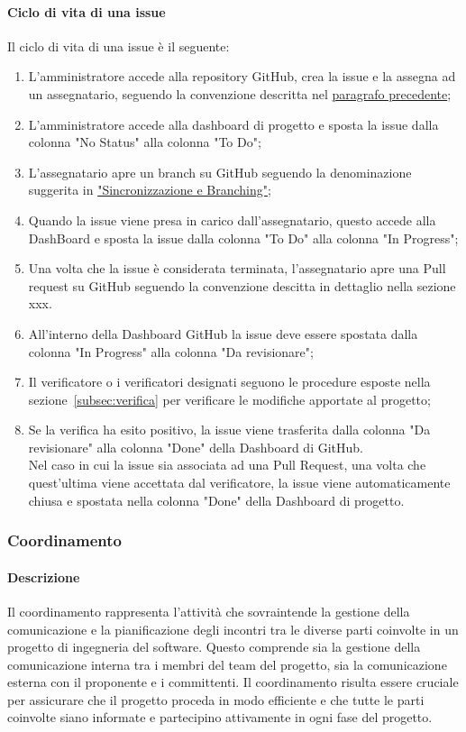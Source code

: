 \paragraph*{Ciclo di vita di una issue}
Il ciclo di vita di una issue è il seguente:
\begin{enumerate}
    \item L'amministratore accede alla repository GitHub, crea la issue e la assegna ad un assegnatario, seguendo la convenzione descritta nel \hyperlink{par:proceduraCreazioneIssue}{paragrafo precedente};
    \item L'amministratore accede alla dashboard di progetto e sposta la issue dalla colonna "No Status" alla colonna "To Do";
    \item L'assegnatario apre un branch su GitHub seguendo la denominazione suggerita in \hyperlink{par:sincronizzazione&branching}{"Sincronizzazione e Branching"};
    \item Quando la issue viene presa in carico dall'assegnatario, questo accede alla DashBoard e sposta la issue dalla colonna "To Do" alla colonna "In Progress";
    \item Una volta che la issue è considerata terminata, l'assegnatario apre una Pull request su GitHub seguendo la convenzione descitta in dettaglio nella sezione xxx. 
    \item All'interno della Dashboard GitHub la issue deve essere spostata dalla colonna "In Progress" alla colonna "Da revisionare";
    \item Il verificatore o i verificatori designati seguono le procedure esposte nella sezione~\ref{subsec:verifica} per verificare le modifiche apportate al progetto;
    \item Se la verifica ha esito positivo, la issue viene trasferita dalla colonna "Da revisionare" alla colonna "Done" della Dashboard di GitHub. \\
    Nel caso in cui la issue sia associata ad una Pull Request, una volta che quest'ultima viene accettata dal verificatore, la issue viene automaticamente chiusa e spostata nella colonna "Done" della Dashboard di progetto. 
\end{enumerate}

\subsubsection{Coordinamento}

\paragraph{Descrizione}
Il coordinamento rappresenta l'attività che sovraintende la gestione della comunicazione e la pianificazione degli incontri tra le diverse parti coinvolte in un progetto di ingegneria del software. Questo comprende sia la gestione della comunicazione interna tra i membri del team del progetto, sia la comunicazione esterna con il proponente e i committenti. Il coordinamento risulta essere cruciale per assicurare che il progetto proceda in modo efficiente e che tutte le parti coinvolte siano informate e partecipino attivamente in ogni fase del progetto.

